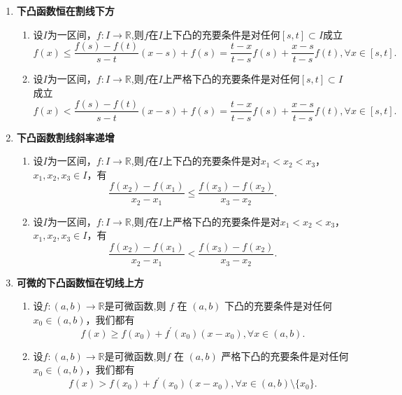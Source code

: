 \documentclass[../../main.tex]{subfiles}%
\begin{document}
\begin{proposition}[下凸函数的基本性质]\label{proposition:下凸函数的基本性质}
\begin{enumerate}
\item\label{下凸函数恒在割线下方} \textbf{下凸函数恒在割线下方}
\begin{enumerate}[(1)]
\item 设\(I\)为一区间，\(f:I\to\mathbb{R}\),则\(f\)在\(I\)上下凸的充要条件是对任何\([s,t]\subset I\)成立
\[
f(x)\leqslant \frac{f(s)-f(t)}{s-t}(x-s)+f(s)=\frac{t-x}{t-s}f\left( s \right) +\frac{x-s}{t-s}f\left( t \right) ,\forall x\in [s,t].
\]

\item 设\(I\)为一区间，\(f:I\to\mathbb{R}\),则\(f\)在\(I\)上严格下凸的充要条件是对任何\([s,t]\subset I\)成立
\[
f(x)<\frac{f(s)-f(t)}{s-t}(x-s)+f(s)=\frac{t-x}{t-s}f\left( s \right) +\frac{x-s}{t-s}f\left( t \right) ,\forall x\in [s,t].
\]
\end{enumerate}

\item\label{下凸函数割线斜率递增} \textbf{下凸函数割线斜率递增}
\begin{enumerate}[(1)]
\item 设\(I\)为一区间，\(f:I\to\mathbb{R}\),则\(f\)在\(I\)上下凸的充要条件是对\(x_1 < x_2 < x_3\)，\(x_1,x_2,x_3\in I\)，有
\[
\frac{f(x_2)-f(x_1)}{x_2 - x_1}\leqslant\frac{f(x_3)-f(x_2)}{x_3 - x_2}.
\]

\item 设\(I\)为一区间，\(f:I\to\mathbb{R}\),则\(f\)在\(I\)上严格下凸的充要条件是对\(x_1 < x_2 < x_3\)，\(x_1,x_2,x_3\in I\)，有
\[
\frac{f(x_2)-f(x_1)}{x_2 - x_1}<\frac{f(x_3)-f(x_2)}{x_3 - x_2}.
\]
\end{enumerate}

\item\label{可微的下凸函数恒在切线上方} \textbf{可微的下凸函数恒在切线上方}
\begin{enumerate}[(1)]
\item 设\(f:(a,b)\to\mathbb{R}\)是可微函数,则 \(f\) 在 \((a,b)\) 下凸的充要条件是对任何 \(x_{0}\in(a,b)\)，我们都有
\[
f(x)\geqslant f(x_{0})+f^{\prime}(x_{0})(x - x_{0}),\forall x\in(a,b).
\]

\item 设\(f:(a,b)\to\mathbb{R}\)是可微函数,则\(f\) 在 \((a,b)\) 严格下凸的充要条件是对任何 \(x_{0}\in(a,b)\)，我们都有
\[
f(x)> f(x_{0})+f^{\prime}(x_{0})(x - x_{0}),\forall x\in(a,b)\setminus\{x_{0}\}.
\]
\end{enumerate}
\end{enumerate}
\end{proposition}
\end{document}
